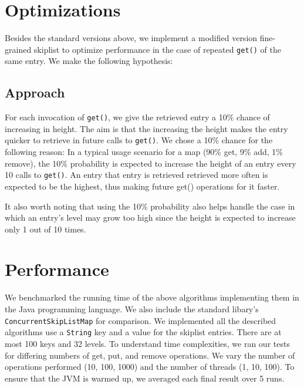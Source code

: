 \documentclass[12pt,oneline,a4paper]{ouparticle}
\begin{document}
\section{Optimizations}
Besides the standard versions above, we implement a modified version fine-grained skiplist to optimize performance in the case of repeated {\tt get()} of the same entry. We make the following hypothesis:



\subsection{Approach}

For each invocation of {\tt get()}, we give the retrieved entry a 10\% chance of increasing in height. The aim is that the increasing the height makes the entry quicker to retrieve in future calls to {\tt get()}. We chose a 10\% chance for the following reason: In a typical usage scenario for a map ({90\% get, 9\% add, 1\% remove}), the 10\% probability is expected to increase the height of an entry every 10 calls to {\tt get()}. An entry that entry is retrieved retrieved more often is expected to be the highest, thus making future get() operations for it faster. 

It also worth noting that using the 10\% probability also helps handle the case in which an entry's level may grow too high since the height is expected to increase only 1 out of 10 times.

\section{Performance}

We benchmarked the running time of the above algorithms implementing them in the Java programming language. We also include the standard libary's {\tt ConcurrentSkipListMap} for comparison. We implemented all the described algorithms use a {\tt String} key and a {\Integer} value for the skiplist entries. There are at most 100 keys and 32 levels. To understand time complexities, we ran our tests for differing numbers of get, put, and remove operations. We vary the number of operations performed (10, 100, 1000) and the number of threads (1, 10, 100). To ensure that the JVM is warmed up, we averaged each final result over 5 runs.
\end{document}
